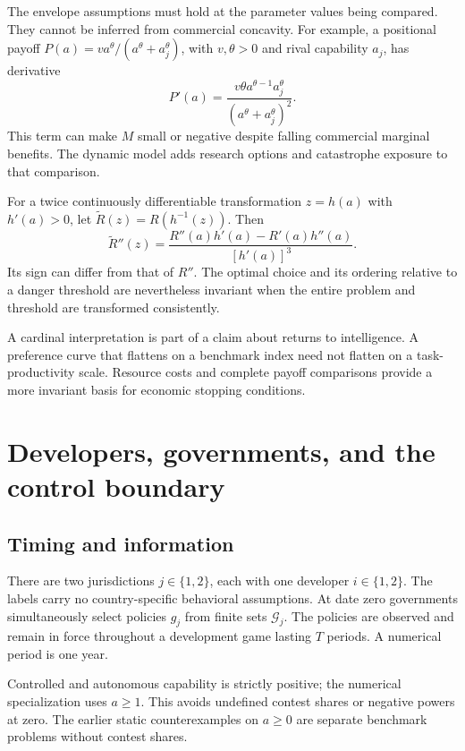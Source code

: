 The envelope assumptions must hold at the parameter values being compared. They cannot be inferred from commercial concavity. For example, a positional payoff $P(a)=v a^\theta/(a^\theta+a_j^\theta)$, with $v,\theta>0$ and rival capability $a_j$, has derivative
\begin{equation}
 P'(a)=\frac{v\theta a^{\theta-1}a_j^\theta}{(a^\theta+a_j^\theta)^2}.
\end{equation}
This term can make $M$ small or negative despite falling commercial marginal benefits. The dynamic model adds research options and catastrophe exposure to that comparison.

\begin{lemma}\label{lem:scale}
For a twice continuously differentiable transformation $z=h(a)$ with $h'(a)>0$, let $\widetilde R(z)=R(h^{-1}(z))$. Then
\begin{equation}\label{eq:transform}
 \widetilde R''(z)=\frac{R''(a)h'(a)-R'(a)h''(a)}{[h'(a)]^3}.
\end{equation}
Its sign can differ from that of $R''$. The optimal choice and its ordering relative to a danger threshold are nevertheless invariant when the entire problem and threshold are transformed consistently.
\end{lemma}

A cardinal interpretation is part of a claim about returns to intelligence. A preference curve that flattens on a benchmark index need not flatten on a task-productivity scale. Resource costs and complete payoff comparisons provide a more invariant basis for economic stopping conditions.

\section{Developers, governments, and the control boundary}\label{sec:model}
\subsection{Timing and information}
There are two jurisdictions $j\in\{1,2\}$, each with one developer $i\in\{1,2\}$. The labels carry no country-specific behavioral assumptions. At date zero governments simultaneously select policies $g_j$ from finite sets $\mathcal G_j$. The policies are observed and remain in force throughout a development game lasting $T$ periods. A numerical period is one year.

Controlled and autonomous capability is strictly positive; the numerical specialization uses $a\geq1$. This avoids undefined contest shares or negative powers at zero. The earlier static counterexamples on $a\geq0$ are separate benchmark problems without contest shares.

